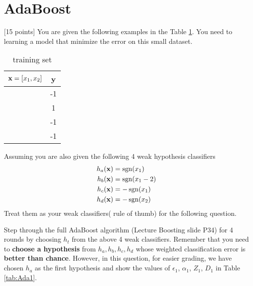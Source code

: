 \section{AdaBoost }

[15 points] You are given the following examples in the Table \ref{tab:AdaBoost}. You need to learning a model that minimize the error on this small dataset. 
\begin{table}[H]
  \centering
  \caption{training set}
  \label{tab:AdaBoost}
  \begin{tabular}{|c|c|}
    \hline
    ${\bf x} = [x_1,x_2]$  & y  \\ \hline
    [1,1]  & -1 \\ \hline
    [1,-1]  & 1 \\ \hline
    [-1,-1] & -1 \\ \hline
    [-1,1] & -1 \\ \hline
  \end{tabular}
\end{table}
Assuming you are also given the following 4 weak hypothesis classifiers
\begin{align*}
  h_a(\bf{x})&= \operatorname{sgn}(x_1) \\
  h_b(\bf{x}) &= \operatorname{sgn}(x_1-2) \\
  h_c(\bf{x}) &= -\operatorname{sgn}(x_1) \\
  h_d(\bf{x}) &= -\operatorname{sgn}(x_2) \\
\end{align*}
Treat them as your weak classifiers( rule of thumb) for the following
question.

Step through the full AdaBoost algorithm (Lecture Boosting slide P34)
for 4 rounds by choosing $h_t$ from the above 4 weak classifiers.
Remember that you need to {\bf choose a hypothesis } from $h_a, h_b,
h_c, h_d$ whose weighted classification error is {\bf better than
  chance}. However, in this question, for easier grading, we have
chosen $h_a$ as the first hypothesis and show the values of
$\epsilon_1$, $\alpha_1$, $Z_1$, $D_1$ in Table \ref{tab:Ada1}. 

